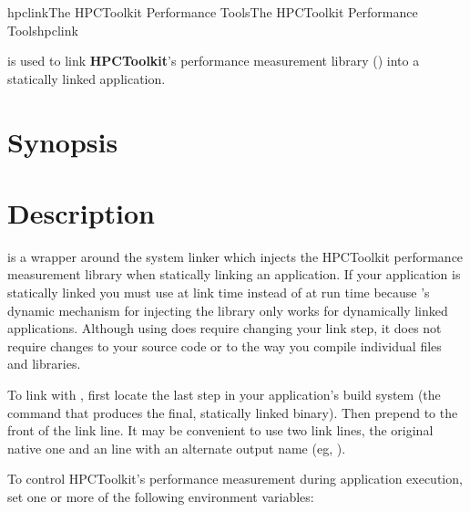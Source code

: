 \documentclass[english]{article}
\begin{document}
\begin{Name}{1}{hpclink}{The HPCToolkit Performance Tools}{The HPCToolkit Performance Tools}{hpclink}

 is used to link \textbf{HPCToolkit}'s performance measurement library () into a  statically linked application.

\end{Name}

\section{Synopsis}

  

\section{Description}

 is a wrapper around the system linker
which injects the HPCToolkit performance measurement library
when statically linking an application.
If your application is statically linked you must use  at link time
instead of  at run time
because 's dynamic mechanism for injecting the library
only works for dynamically linked applications.
Although using  does require changing your link step,
it does not require changes to your source code
or to the way you compile individual files and libraries.

To link with , first locate the last step in your application's build system
(the command that produces the final, statically linked binary).
Then prepend  to the front of the link line.
It may be convenient to use two link lines, the original native one
and an  line with an alternate output name (eg,
).

To control HPCToolkit's performance measurement during application execution,
set one or more of the following environment variables:
\end{document}
